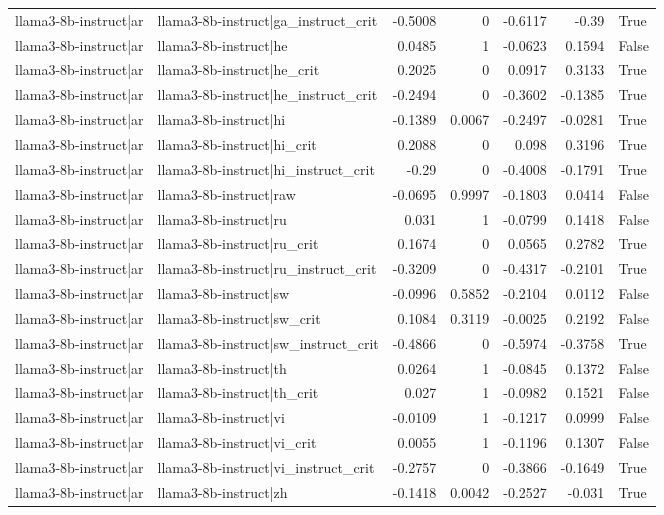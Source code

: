 \begin{table}
\begin{tabular}{l l r r r r l}
llama3-8b-instruct|ar & llama3-8b-instruct|ga_instruct_crit & -0.5008 & 0 & -0.6117 & -0.39 & True \\
llama3-8b-instruct|ar & llama3-8b-instruct|he & 0.0485 & 1 & -0.0623 & 0.1594 & False \\
llama3-8b-instruct|ar & llama3-8b-instruct|he_crit & 0.2025 & 0 & 0.0917 & 0.3133 & True \\
llama3-8b-instruct|ar & llama3-8b-instruct|he_instruct_crit & -0.2494 & 0 & -0.3602 & -0.1385 & True \\
llama3-8b-instruct|ar & llama3-8b-instruct|hi & -0.1389 & 0.0067 & -0.2497 & -0.0281 & True \\
llama3-8b-instruct|ar & llama3-8b-instruct|hi_crit & 0.2088 & 0 & 0.098 & 0.3196 & True \\
llama3-8b-instruct|ar & llama3-8b-instruct|hi_instruct_crit & -0.29 & 0 & -0.4008 & -0.1791 & True \\
llama3-8b-instruct|ar & llama3-8b-instruct|raw & -0.0695 & 0.9997 & -0.1803 & 0.0414 & False \\
llama3-8b-instruct|ar & llama3-8b-instruct|ru & 0.031 & 1 & -0.0799 & 0.1418 & False \\
llama3-8b-instruct|ar & llama3-8b-instruct|ru_crit & 0.1674 & 0 & 0.0565 & 0.2782 & True \\
llama3-8b-instruct|ar & llama3-8b-instruct|ru_instruct_crit & -0.3209 & 0 & -0.4317 & -0.2101 & True \\
llama3-8b-instruct|ar & llama3-8b-instruct|sw & -0.0996 & 0.5852 & -0.2104 & 0.0112 & False \\
llama3-8b-instruct|ar & llama3-8b-instruct|sw_crit & 0.1084 & 0.3119 & -0.0025 & 0.2192 & False \\
llama3-8b-instruct|ar & llama3-8b-instruct|sw_instruct_crit & -0.4866 & 0 & -0.5974 & -0.3758 & True \\
llama3-8b-instruct|ar & llama3-8b-instruct|th & 0.0264 & 1 & -0.0845 & 0.1372 & False \\
llama3-8b-instruct|ar & llama3-8b-instruct|th_crit & 0.027 & 1 & -0.0982 & 0.1521 & False \\
llama3-8b-instruct|ar & llama3-8b-instruct|vi & -0.0109 & 1 & -0.1217 & 0.0999 & False \\
llama3-8b-instruct|ar & llama3-8b-instruct|vi_crit & 0.0055 & 1 & -0.1196 & 0.1307 & False \\
llama3-8b-instruct|ar & llama3-8b-instruct|vi_instruct_crit & -0.2757 & 0 & -0.3866 & -0.1649 & True \\
llama3-8b-instruct|ar & llama3-8b-instruct|zh & -0.1418 & 0.0042 & -0.2527 & -0.031 & True \\

\end{tabular}
\end{table}
